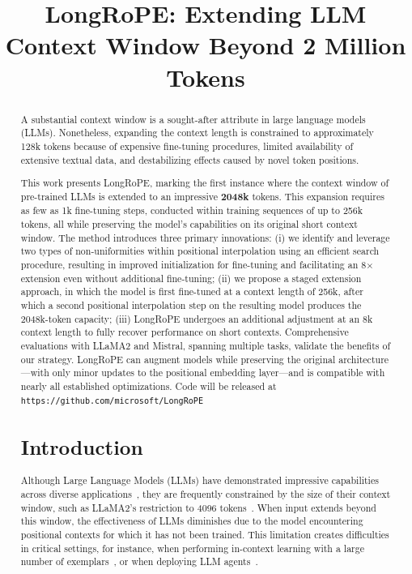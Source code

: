\title{LongRoPE: Extending LLM Context Window Beyond 2 Million Tokens}

\begin{abstract}
A substantial context window is a sought-after attribute in large language models (LLMs). Nonetheless, expanding the context length is constrained to approximately 128k tokens because of expensive fine-tuning procedures, limited availability of extensive textual data, and destabilizing effects caused by novel token positions.

This work presents LongRoPE, marking the first instance where the context window of pre-trained LLMs is extended to an impressive \textbf{2048k} tokens. This expansion requires as few as 1k fine-tuning steps, conducted within training sequences of up to 256k tokens, all while preserving the model’s capabilities on its original short context window. The method introduces three primary innovations: (i) we identify and leverage two types of non-uniformities within positional interpolation using an efficient search procedure, resulting in improved initialization for fine-tuning and facilitating an 8$\times$ extension even without additional fine-tuning; (ii) we propose a staged extension approach, in which the model is first fine-tuned at a context length of 256k, after which a second positional interpolation step on the resulting model produces the 2048k-token capacity; (iii) LongRoPE undergoes an additional adjustment at an 8k context length to fully recover performance on short contexts. Comprehensive evaluations with LLaMA2 and Mistral, spanning multiple tasks, validate the benefits of our strategy. LongRoPE can augment models while preserving the original architecture—with only minor updates to the positional embedding layer—and is compatible with nearly all established optimizations. Code will be released at \texttt{https://github.com/microsoft/LongRoPE}

\section{Introduction}

Although Large Language Models (LLMs) have demonstrated impressive capabilities across diverse applications~\cite{gpt4,llama2}, they are frequently constrained by the size of their context window, such as LLaMA2's restriction to 4096 tokens~\cite{llama2}. When input extends beyond this window, the effectiveness of LLMs diminishes due to the model encountering positional contexts for which it has not been trained. This limitation creates difficulties in critical settings, for instance, when performing in-context learning with a large number of exemplars~\cite{Huang2023FewerIM}, or when deploying LLM agents~\cite{park2023generative,madaan2023selfrefine}.


\end{abstract}
